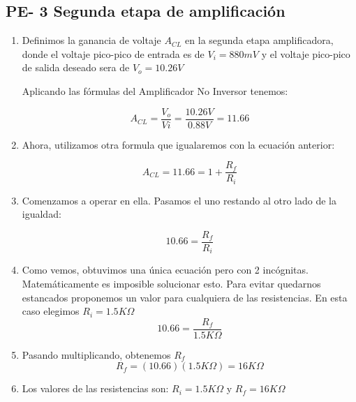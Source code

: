 \documentclass[12pt]{article}
\begin{document}
		\subsection{PE- 3 Segunda etapa de amplificación}
		
		\begin{enumerate}
        		\item Definimos la ganancia de voltaje $A_{CL}$ en la segunda etapa amplificadora, donde el voltaje pico-pico de entrada es de $V_{i}=880 mV$ y el voltaje pico-pico de salida deseado sera de $V_{o}=10.26 V$
        		
        		Aplicando las fórmulas del Amplificador No Inversor tenemos:

        				$$ A_{CL} = \frac{V_{o}}{V{i}} = \frac{10.26 V}{0.88 V} = 11.66 $$
        				
        				
        	\item Ahora, utilizamos otra formula que igualaremos con la ecuación anterior:
        	
        	$$ A_{CL} =
        				11.66 = 1 + \frac{R_{f}}{R_{i}} $$
        				
            \item Comenzamos a operar en ella. Pasamos el uno restando al otro lado de la igualdad:
            
            $$ 10.66 = \frac{R_{f}}{R_{i}} $$
        	
        	\item Como vemos, obtuvimos una única ecuación pero con 2 incógnitas. Matemáticamente es imposible solucionar esto. Para evitar quedarnos estancados proponemos un valor para cualquiera de las resistencias. En esta caso elegimos $R_{i} = 1.5K\Omega$
        	\\
        	$$ 10.66 = \frac{R_{f}}{1.5K\Omega} $$
            
            \item Pasando multiplicando, obtenemos $R_{f}$
            \\
            $$ R_{f} = (10.66)(1.5K\Omega) = 16K\Omega $$
            
            \item Los valores de las resistencias son: $R_{i} = 1.5K\Omega$ y $R_{f} = 16K\Omega$
        	
        \end{enumerate}
		
\end{document}
